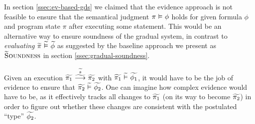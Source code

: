 In section \ref{ssec:ev-based-gds} we claimed that the evidence approach is not feasible to ensure that the semantical judgment $\evalphiGen{\pi}{\phi}$ holds for given formula $\phi$ and program state $\pi$ after executing some statement.
This would be an alternative way to ensure soundness of the gradual system, in contrast to \emph{evaluating} $\evalgphiGen{\grad{\pi}}{\grad{\phi}}$ as suggested by the baseline approach we present as $\tset{\gradT Soundness}$ in section \ref{ssec:gradual-soundness}.

Given an execution $\gsstepConsume{\grad{s}}{\grad{\pi_1}}{\grad{\pi_2}}$ with $\evalgphiGen{\grad{\pi_1}}{\grad{\phi_1}}$, it would have to be the job of evidence to ensure that $\evalgphiGen{\grad{\pi_2}}{\grad{\phi_2}}$.
One can imagine how complex evidence would have to be, as it effectively tracks all changes to $\grad{\pi_1}$ (on its way to become $\grad{\pi_2}$) in order to figure out whether these changes are consistent with the postulated “type” $\grad{\phi_2}$.

